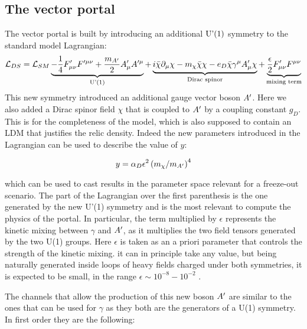 \subsection{The vector portal}
\label{ch1:sec:dm-colliders}

The vector portal is built by introducing an additional $\textrm{U'(1)}$ symmetry to the standard model Lagrangian:
\begin{equation}
  \label{eq:dm-lagrangian}
  \mathcal{L}_{DS} = \mathcal{L}_{SM} \underbrace{- \frac{1}{4}F'_{\mu \nu}F'^{\mu \nu} + \frac{m_{A'}}{2}A'_{\mu}A'^{\mu}}_{\textrm{U'(1)}} + \underbrace{i \bar{\chi} \partial_{\mu} \chi - m_{\chi}\bar{\chi}\chi - e_D \bar{\chi}\gamma^{\mu}A'_{\mu}\chi}_{\textrm{Dirac spinor}} + \underbrace{\frac{\epsilon}{2}F'_{\mu \nu} F^{\mu \nu}}_{\textrm{mixing term}}
\end{equation}
This new symmetry introduced an additional gauge vector boson $A'$. Here we also added a Dirac spinor field $\chi$ that is coupled to $A'$ by a coupling constant $g_D$. This is for the completeness of the model, which is also supposed to contain an LDM that justifies the relic density. Indeed the new parameters introduced in the Lagrangian can be used to describe the value of $y$:

    \begin{equation}
      \label{eq:dmplane-y-dp}
      y = \alpha_D \epsilon^2 \left(m_{\chi}/ m_{A'} \right)^4 
    \end{equation}

which can be used to cast results in the parameter space relevant for a freeze-out scenario.
The part of the Lagrangian over the first parenthesis is the one generated by the new U'(1) symmetry and is the most relevant to compute the physics of the portal. In particular, the term multiplied by $\epsilon$ represents the kinetic mixing between $\gamma$ and $A'$, as it multiplies the two field tensors generated by the two U(1) groups. Here $\epsilon$ is taken as an a priori parameter that controls the strength of the kinetic mixing. it can in principle take any value, but being naturally generated inside loops of heavy fields charged under both symmetries, it is expected to be small, in the range $\epsilon \sim 10^{-8} - 10^{-2}$ \cite{jdb}. 

The channels that allow the production of this new boson $A'$ are similar to the ones that can be used for $\gamma$ as they both are the generators of a U(1) symmetry. In first order they are the following:

